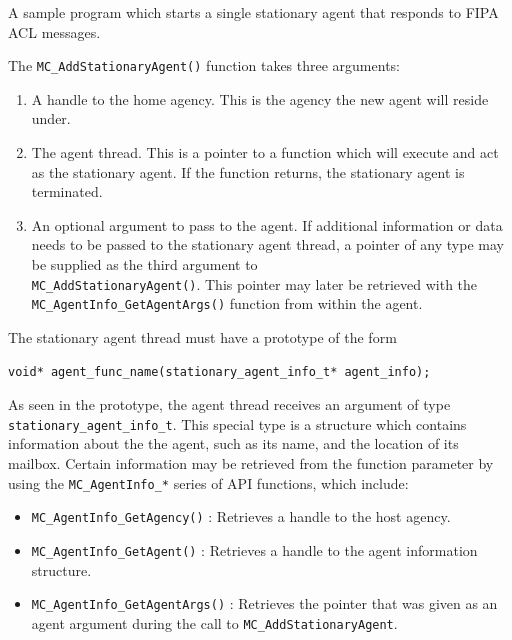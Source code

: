 \documentclass[11pt]{report}
\begin{document}
\begin{Program}[!t]
\begin{center}
   {\footnotesize \linespread{1.0} }
\end{center}
\caption{A sample program which starts a single stationary agent that responds to FIPA ACL messages.}
\label{prog:stationary_agent_server}
\end{Program}

The \texttt{MC\_AddStationaryAgent()} function takes three arguments:
\begin{enumerate}
\item A handle to the home agency. This is the agency the new agent will reside under.
\item The agent thread. This is a pointer to a function which will execute and act as
the stationary agent. If the function returns, the stationary agent is terminated.
\item An optional argument to pass to the agent. If additional information or data needs
to be passed to the stationary agent thread, a pointer of any type may be supplied as the
third argument to \\
\texttt{MC\_AddStationaryAgent()}. This pointer may later be retrieved
with the \\
\texttt{MC\_AgentInfo\_GetAgentArgs()} function from within the agent.
\end{enumerate}

The stationary agent thread must have a prototype of the form
\begin{verbatim}
void* agent_func_name(stationary_agent_info_t* agent_info);
\end{verbatim}
As seen in the prototype, the agent thread receives an argument of type
\texttt{stationary\_agent\_info\_t}. This special type is a structure 
which contains information about the the agent, such as its name, and the
location of its mailbox. Certain information may be retrieved from the 
function parameter by using the \texttt{MC\_AgentInfo\_*} series of API
functions, which include:
\begin{itemize}
\item \texttt{MC\_AgentInfo\_GetAgency()} : Retrieves a handle to the host agency.
\item \texttt{MC\_AgentInfo\_GetAgent()} : Retrieves a handle to the agent
information structure.
\item \texttt{MC\_AgentInfo\_GetAgentArgs()} : Retrieves the pointer that was
given as an agent argument during the call to \texttt{MC\_AddStationaryAgent}.
\end{itemize}
\end{document}
